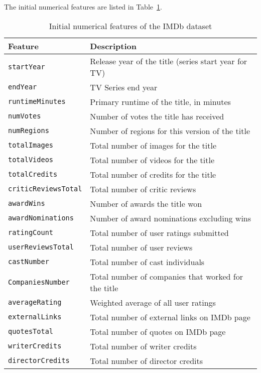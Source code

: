 The initial numerical features are listed in
Table~\ref{tab:initial_features_numerical}.

\begin{table}[h]
    \centering
    \begin{tabular}{|p{4cm}|p{9cm}|}
        \hline
        \textbf{Feature} & \textbf{Description} \\ \hline
        \texttt{startYear} & Release year of the title (series start year for TV) \\ \hline
        \texttt{endYear} & TV Series end year \\ \hline
        \texttt{runtimeMinutes} & Primary runtime of the title, in minutes \\ \hline
        \texttt{numVotes} & Number of votes the title has received \\ \hline
        \texttt{numRegions} & Number of regions for this version of the title \\ \hline
        \texttt{totalImages} & Total number of images for the title \\ \hline
        \texttt{totalVideos} & Total number of videos for the title \\ \hline
        \texttt{totalCredits} & Total number of credits for the title \\ \hline
        \texttt{criticReviewsTotal} & Total number of critic reviews \\ \hline
        \texttt{awardWins} & Number of awards the title won \\ \hline
        \texttt{awardNominations} & Number of award nominations excluding wins \\ \hline
        \texttt{ratingCount} & Total number of user ratings submitted \\ \hline
        \texttt{userReviewsTotal} & Total number of user reviews \\ \hline
        \texttt{castNumber} & Total number of cast individuals \\ \hline
        \texttt{CompaniesNumber} & Total number of companies that worked for the title \\ \hline
        \texttt{averageRating} & Weighted average of all user ratings \\ \hline
        \texttt{externalLinks} & Total number of external links on IMDb page \\ \hline
        \texttt{quotesTotal} & Total number of quotes on IMDb page \\ \hline
        \texttt{writerCredits} & Total number of writer credits \\ \hline
        \texttt{directorCredits} & Total number of director credits \\ \hline
    \end{tabular}
    \caption{Initial numerical features of the IMDb dataset}
    \label{tab:initial_features_numerical}
\end{table}

